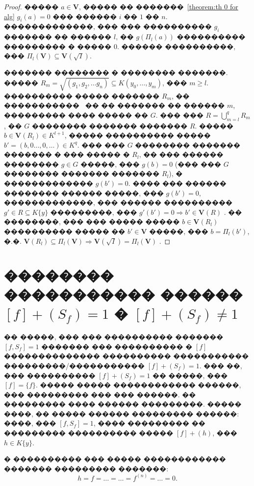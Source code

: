 \documentclass[16pt]{article}
\newcommand{\orange}[1]{{\color{orange}#1}}
\theoremstyle{plain}
\theoremstyle{definition}
\theoremstyle{remark}
\begin{document}
\begin{proof}
����� $a\in \mathbf{V}$, ����� �� �������~\ref{theorem:th 0 for alg} $g_i(a)=0$ ��� ������ $i$ �� $1$ �� $n$. �������������, ��� ��� ���������� $g_i$  ������� �� ������ $l$, �� $g(\Pi_l(a))$ ���������� ��������� � ����� 0. ������ ����������, ��� $\Pi_l(\mathbf{V})\subseteq\mathbf{V}(\sqrt{I})$.

������� �������� � �������� �������. ����� $R_m=\sqrt{(g_1,g_2,\ldots g_n)}\subseteq K(y_0,\ldots,y_m)$, ��� $m\geq l$. ���������� ����� ������� $R_m$, �� �����������~\cite[Chapter~IV, Section~2, Suggestion~8]{Cox} �� �� ������� �� ������ $m$, ��������� ���� ����� �� $G$. ��� ���  $R=\bigcup\limits_{m=l}^{q}R_m$, �� $G$ �������� ������� �������  $R$. ����� $b\in\mathbf{V}(R_l)\in K^{l+1}$, ����� ���������� ����� $b'=(b,0\ldots,0,\ldots)\in K^{q}$. ��� ��� $G$ �������� ������� ������� � ��� ����� � $R_l$, �� ��� ������ �������� $g\in G$ �����, ��� $g(b)=0$ (��� ��� $G$ �������� ������� ������� $R_l$), � ������������� $g(b')=0$. ���� ��� ������ �������� ������ �����, ��� $g(b')=0$, �������������, ��� ������ ����������  $g'\in R\subseteq K\{y\}$ ���������, ��� $g'(b')=0\Rightarrow b'\in\mathbf{V}(R)$  . �� ��������, ��� ��� ����� �����  $b\in\mathbf{V}(R_l)$ ���������� ����� �� $b'\in\mathbf{V}$ �����, ��� $b=\Pi_l(b')$, �.�. $\mathbf{V}(R_l)\subseteq\Pi_l(\mathbf{V})\Rightarrow \mathbf{V}(\sqrt{I})=\Pi_l(\mathbf{V})$ . 
\end{proof}
\section{ �������� ����������� ������ $[f]+(S_f)=1$ � $[f]+(S_f)\neq1$}


�� �����, ��� ��� ���������� ������� $[f,S_f]=1$ ������� ��� ���������� � $[f]$ �������������� ���������� ����������� ���������/����������� $[f]+(S_f)=1$. ��� ��, ��� ���������� $[f]+(S_f)=1$ �� �����, ��� $[f]=\{f\}$. ����� ����� ������������ ������, ��� ��������� ��� ��� ������. �� ��������� ���� ������ ���������. ����� ����, �� ����� ������ ��������� ������: ����, ��� $[f,S_f]=1$, ���� ��������� �� ��������� ���������� ����� $[f]+(h)$, ��� $h\in K\{y\}$.

� ���������� ��� ����� ������������ ������� ��������� �������:
\begin{equation}h=f=\ldots=\ldots=f^{(n)}=\ldots=0. \end{equation}
\end{document}

